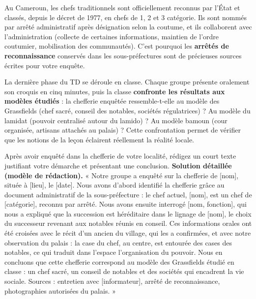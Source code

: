 \documentclass[11pt]{article}
\newcommand{\cle}[1]{{\popxbold\color{popdark}#1}}
\newcounter{popsec}
\newcounter{popsub}
\newcommand{\courssub}[1]{%
  \stepcounter{popsub}%
  \par\vspace{9pt}\noindent{\popxbold\fontsize{11.5}{13}\selectfont\color{popink}{\color{poporange}\thepopsec.\thepopsub}\hspace{6pt}#1}\par\nopagebreak\vspace{4pt}
}
\begin{document}
\begin{savaistu}
Au Cameroun, les chefs traditionnels sont officiellement reconnus par l'État et classés, depuis le décret de 1977, en \cle{chefs de 1\iere{}, 2\ieme{} et 3\ieme{} catégorie}. Ils sont nommés par arrêté administratif après désignation selon la coutume, et ils collaborent avec l'administration (collecte de certaines informations, maintien de l'ordre coutumier, mobilisation des communautés). C'est pourquoi les \textbf{arrêtés de reconnaissance} conservés dans les sous-préfectures sont de précieuses sources écrites pour votre enquête.
\end{savaistu}

\courssub{Restitution en classe et évaluation}

La dernière phase du TD se déroule en classe. Chaque groupe présente oralement son croquis en cinq minutes, puis la classe \textbf{confronte les résultats aux modèles étudiés} : la chefferie enquêtée ressemble-t-elle au modèle des Grassfields (chef sacré, conseil des notables, sociétés régulatrices) ? Au modèle du lamidat (pouvoir centralisé autour du lamido) ? Au modèle bamoun (cour organisée, artisans attachés au palais) ? Cette confrontation permet de vérifier que les notions de la leçon éclairent réellement la réalité locale.

\begin{exoresolu}
Après avoir enquêté dans la chefferie de votre localité, rédigez un court texte justifiant votre démarche et présentant une conclusion.
\tcblower
\textbf{Solution détaillée (modèle de rédaction).} « Notre groupe a enquêté sur la chefferie de [nom], située à [lieu], le [date]. Nous avons d'abord identifié la chefferie grâce au document administratif de la sous-préfecture : le chef actuel, [nom], est un chef de [catégorie], reconnu par arrêté. Nous avons ensuite interrogé [nom, fonction], qui nous a expliqué que la succession est héréditaire dans le lignage de [nom], le choix du successeur revenant aux notables réunis en conseil. Ces informations orales ont été croisées avec le récit d'un ancien du village, qui les a confirmées, et avec notre observation du palais : la case du chef, au centre, est entourée des cases des notables, ce qui traduit dans l'espace l'organisation du pouvoir. Nous en concluons que cette chefferie correspond au modèle des Grassfields étudié en classe : un chef sacré, un conseil de notables et des sociétés qui encadrent la vie sociale. Sources : entretien avec [informateur], arrêté de reconnaissance, photographies autorisées du palais. »
\end{exoresolu}
\end{document}
